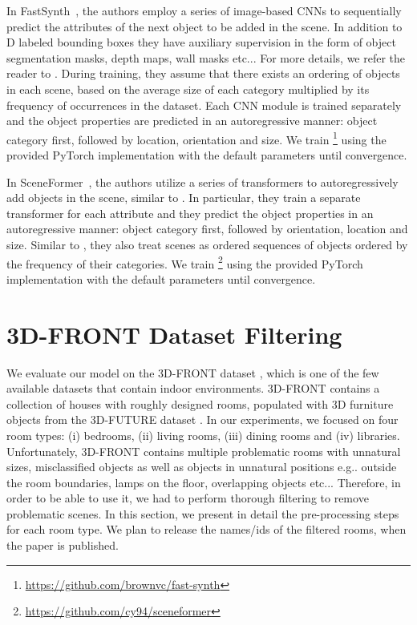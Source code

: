 \documentclass{article}
\makeatletter
\DeclareRobustCommand\onedot{\futurelet\@let@token\@onedot}
\def\@onedot{\ifx\@let@token.\else.\null\fi\xspace}
\def\eg{e.g\onedot} \def\Eg{E.g\onedot}
\def\etc{etc\onedot}
\newcommand{\boldparagraph}[1]{\vspace{0.2cm}\noindent{\bf #1:} }
\makeatother
\begin{document}
\boldparagraph{FastSynth}In FastSynth~\cite{Ritchie2019CVPR}, the authors employ a series of image-based
CNNs to sequentially predict the attributes of the next object to be added in
the scene. In addition to D labeled bounding boxes they have auxiliary
supervision in the form of object segmentation masks, depth maps, wall masks
\etc. For more details, we refer the reader to \cite{Wang2018SIGGRAPH}. During
training, they assume that there exists an ordering of objects in each scene,
based on the average size of each category multiplied by its frequency of
occurrences in the dataset. Each CNN module is trained separately and the object
properties are predicted in an autoregressive manner: object category first,
followed by location, orientation and size. We train
\cite{Ritchie2019CVPR}\footnote{\href{https://github.com/brownvc/fast-synth}{https://github.com/brownvc/fast-synth}}
using the provided PyTorch \cite{Paszke2016ARXIV} implementation with the
default parameters until convergence.

\boldparagraph{SceneFormer}In SceneFormer~\cite{Wang2020ARXIV}, the authors utilize a series of
transformers to autoregressively add objects in the scene, similar to
\cite{Ritchie2019CVPR}. In particular, they train a separate transformer for
each attribute and they predict the object properties in an autoregressive
manner: object category first, followed by orientation, location and size.
Similar to \cite{Ritchie2019CVPR}, they also treat scenes as ordered sequences of
objects ordered by the frequency of their categories.
We train \cite{Wang2020ARXIV}\footnote{\href{https://github.com/cy94/sceneformer}{https://github.com/cy94/sceneformer}} using the provided PyTorch \cite{Paszke2016ARXIV} implementation with the
default parameters until convergence.

\section{3D-FRONT Dataset Filtering}
\label{sec:3d_front_filtering}

We evaluate our model on the 3D-FRONT dataset \cite{Fu2020ARXIVa},
which is one of the few available datasets that contain indoor environments.
3D-FRONT contains a collection
of  houses with roughly  designed rooms,
populated with 3D furniture objects from the 3D-FUTURE dataset
\cite{Fu2020ARXIVb}. In our experiments, we focused on four room types: (i)
bedrooms, (ii) living rooms, (iii) dining rooms and (iv) libraries.
Unfortunately, 3D-FRONT contains multiple problematic rooms with unnatural
sizes, misclassified objects as well as objects in unnatural positions \eg
outside the room boundaries, lamps on the floor, overlapping objects \etc.
Therefore, in order to be able to use it, we had to perform thorough filtering
to remove problematic scenes. In this section, we present in detail the
pre-processing steps for each room type. We plan to release the names/ids of
the filtered rooms, when the paper is published.
\end{document}
